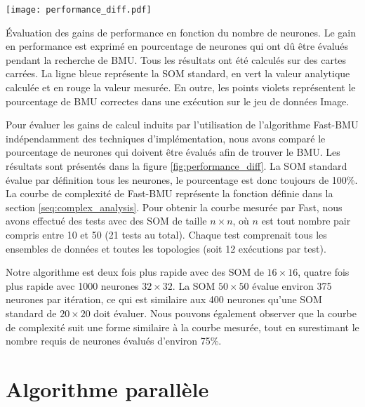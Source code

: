 	\begin{figureth}
    	\centering
    	\texttt{[image: performance\_diff.pdf]}
    	\caption[Évaluation des gains de performance en fonction du nombre de neurones]{Évaluation des gains de performance en fonction du nombre de neurones. Le gain en performance est exprimé en pourcentage de neurones qui ont dû être évalués pendant la recherche de BMU. Tous les résultats ont été calculés sur des cartes carrées. La ligne bleue représente la SOM standard, en vert la valeur analytique calculée et en rouge la valeur mesurée. En outre, les points violets représentent le pourcentage de BMU correctes dans une exécution sur le jeu de données Image.}
    	\label{fig:performance_diff}
	\end{figureth}

	Pour évaluer les gains de calcul induits par l'utilisation de l'algorithme Fast-BMU indépendamment des techniques d'implémentation, nous avons comparé le pourcentage de neurones qui doivent être évalués afin de trouver le BMU. Les résultats sont présentés dans la figure \ref{fig:performance_diff}. La SOM standard évalue par définition tous les neurones, le pourcentage est donc toujours de 100\%. La courbe de complexité de Fast-BMU représente la fonction définie dans la section \ref{seq:complex_analysis}. Pour obtenir la courbe mesurée par Fast, nous avons effectué des tests avec des SOM de taille $n\times n$, où $n$ est tout nombre pair compris entre 10 et 50 (21 tests au total). Chaque test comprenait tous les ensembles de données et toutes les topologies (soit 12 exécutions par test).

	Notre algorithme est deux fois plus rapide avec des SOM de $16\times16$, quatre fois plus rapide avec 1000 neurones $32\times32$. La SOM $50\times50$ évalue environ 375 neurones par itération, ce qui est similaire aux 400 neurones qu'une SOM standard de $20\times20$ doit évaluer. Nous pouvons également observer que la courbe de complexité suit une forme similaire à la courbe mesurée, tout en surestimant le nombre requis de neurones évalués d'environ 75\%.

	\newpage
	\section{Algorithme parallèle}


